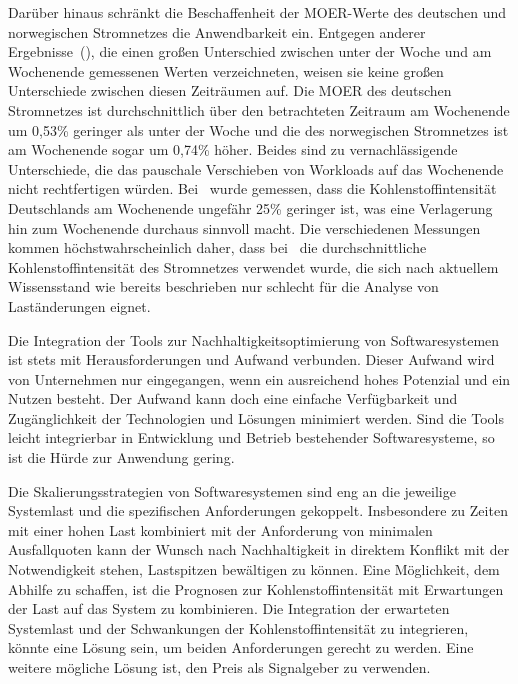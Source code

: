 Darüber hinaus schränkt die Beschaffenheit der \ac{MOER}-Werte des deutschen und norwegischen Stromnetzes die Anwendbarkeit ein.
Entgegen anderer Ergebnisse~(\cite{Wiesner.2021}), die einen großen Unterschied zwischen unter der Woche und am Wochenende gemessenen Werten verzeichneten, weisen sie keine großen Unterschiede zwischen diesen Zeiträumen auf.
Die \ac{MOER} des deutschen Stromnetzes ist durchschnittlich über den betrachteten Zeitraum am Wochenende um 0,53\% geringer als unter der Woche und die des norwegischen Stromnetzes ist am Wochenende sogar um 0,74\% höher.
Beides sind zu vernachlässigende Unterschiede, die das pauschale Verschieben von Workloads auf das Wochenende nicht rechtfertigen würden.
Bei~\cite{Wiesner.2021} wurde gemessen, dass die Kohlenstoffintensität Deutschlands am Wochenende ungefähr 25\% geringer ist, was eine Verlagerung hin zum Wochenende durchaus sinnvoll macht.
Die verschiedenen Messungen kommen höchstwahrscheinlich daher, dass bei~\cite{Wiesner.2021} die durchschnittliche Kohlenstoffintensität des Stromnetzes verwendet wurde, die sich nach aktuellem Wissensstand wie bereits beschrieben nur schlecht für die Analyse von Laständerungen eignet.

Die Integration der Tools zur Nachhaltigkeitsoptimierung von Softwaresystemen ist stets mit Herausforderungen und Aufwand verbunden.
Dieser Aufwand wird von Unternehmen nur eingegangen, wenn ein ausreichend hohes Potenzial und ein Nutzen besteht.
Der Aufwand kann doch eine einfache Verfügbarkeit und Zugänglichkeit der Technologien und Lösungen minimiert werden.
Sind die Tools leicht integrierbar in Entwicklung und Betrieb bestehender Softwaresysteme, so ist die Hürde zur Anwendung gering.

Die Skalierungsstrategien von Softwaresystemen sind eng an die jeweilige Systemlast und die spezifischen Anforderungen gekoppelt.
Insbesondere zu Zeiten mit einer hohen Last kombiniert mit der Anforderung von minimalen Ausfallquoten kann der Wunsch nach Nachhaltigkeit in direktem Konflikt mit der Notwendigkeit stehen, Lastspitzen bewältigen zu können.
Eine Möglichkeit, dem Abhilfe zu schaffen, ist die Prognosen zur Kohlenstoffintensität mit Erwartungen der Last auf das System zu kombinieren.
Die Integration der erwarteten Systemlast und der Schwankungen der Kohlenstoffintensität zu integrieren, könnte eine Lösung sein, um beiden Anforderungen gerecht zu werden.
Eine weitere mögliche Lösung ist, den Preis als Signalgeber zu verwenden.

